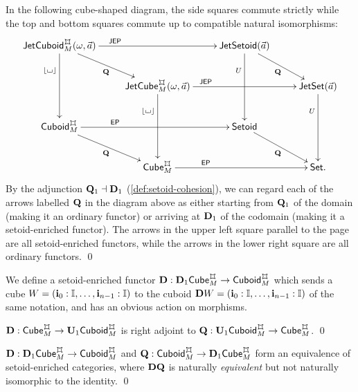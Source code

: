 \documentclass[a4paper]{memoir}
\begin{document}
\begin{corollary}
	In the following cube-shaped diagram, the side squares commute strictly while the top and bottom squares commute up to compatible natural isomorphisms:
	\[
		\xymatrix{
			\jetcuboid{\myorix}{\mycubex}{M}{\vec a}
				\ar[rr]^(.3)\JEP
				\ar[dd]_(.3){\erasejc{\loch}}
				\ar[rd]_{\setoidquot}
			&&
			\jetsetoid{\vec a}
				\ar[dd]_(.3){U}
				\ar[rd]_{\setoidquot}
			\\
			&
			\jetcube{\myorix}{\mycubex}{M}{\vec a}
				\ar[rr]^(.3)\JEP
				\ar[dd]_(.3){\erasejc{\loch}}
			&&
			\jetset{\vec a}
				\ar[dd]_(.3){U}
			\\
			\cuboidcat^\mycubex_M
				\ar[rr]^(.3)\EP
				\ar[rd]_{\setoidquot}
			&&
			\Setoid
				\ar[rd]_{\setoidquot}
			\\
			&
			\cubecat^\mycubex_M
				\ar[rr]^(.3)\EP
			&&
			\Set.
		}
	\]
	By the adjunction ${\mathbf{Q}}_1 \dashv {\mathbf{D}}_1$ (\cref{def:setoid-cohesion}), we can regard each of the arrows labelled ${\mathbf{Q}}$ in the diagram above as either starting from ${\mathbf{Q}}_1$ of the domain (making it an ordinary functor) or arriving at ${\mathbf{D}}_1$ of the codomain (making it a setoid-enriched functor).
	The arrows in the upper left square parallel to the page are all setoid-enriched functors, while the arrows in the lower right square are all ordinary functors. \qed
\end{corollary}
\begin{definition} \label{def:cuboid-cohesion}
	We define a setoid-enriched functor $\setoiddisc : \setoiddisc_1 \cubecat^\mycubex_M \to \cuboidcat^\mycubex_M$ which sends a cube $W = (\mathbf{i}_0 : {\mathbb I}, \ldots, \mathbf{i}_{n-1} : {\mathbb I})$ to the cuboid ${\mathbf{D}} W = (\mathbf{i}_0 : {\mathbb I}, \ldots, \mathbf{i}_{n-1} : {\mathbb I})$ of the same notation, and has an obvious action on morphisms.
\end{definition}
\begin{corollary} \label{thm:cuboid-cohesion}
	$\setoiddisc : \cubecat^\mycubex_M \to \setoidfget_1 \cuboidcat^\mycubex_M$ is right adjoint to $\setoidquot : \setoidfget_1 \cuboidcat^\mycubex_M \to \cubecat^\mycubex_M$. \qed
\end{corollary}
\begin{corollary} \label{thm:cuboid-equiv-cube}
	$\setoiddisc : \setoiddisc_1 \cubecat^\mycubex_M \to \cuboidcat^\mycubex_M$ and $\setoidquot : \cuboidcat^\mycubex_M \to \setoiddisc_1 \cubecat^\mycubex_M$ form an equivalence of setoid-enriched categories, where ${\mathbf{D}} {\mathbf{Q}}$ is naturally \emph{equivalent} but not naturally isomorphic to the identity. \qed
\end{corollary}
\end{document}
